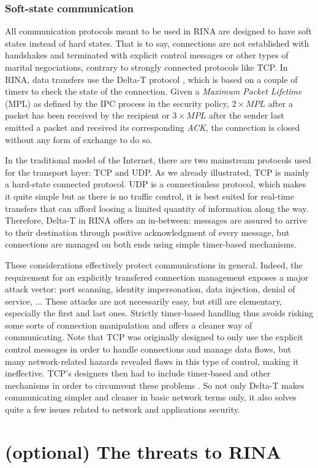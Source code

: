 \documentclass[a4paper]{proc}
\begin{document}
\section{Soft-state communication}

\par All communication protocols meant to be used in RINA are designed to have
soft states instead of hard states. That is to say, connections are not
established with handshakes and terminated with explicit control messages or
other types of marital negociations, contrary to strongly connected protocols
like TCP. In RINA, data transfers use the Delta-T protocol \cite{delta-t}, which
is based on a couple of timers to check the state of the connection. Given a
\textit{Maximum Packet Lifetime} (MPL) as defined by the IPC process in the
security policy, $2 \times MPL$ after a packet has been received by the
recipient or $3 \times MPL$ after the sender last emitted a packet and received
its corresponding \textit{ACK}, the connection is closed without any form of
exchange to do so.

\par In the traditional model of the Internet, there are two mainstream
protocols used for the transport layer: TCP and UDP. As we already illustrated,
TCP is mainly a hard-state connected protocol. UDP is a connectionless protocol,
which makes it quite simple but as there is no traffic control, it is best
suited for real-time transfers that can afford loosing a limited quantity of
information along the way. Therefore, Delta-T in RINA offers an in-between:
messages are assured to arrive to their destination through positive
acknowledgment of every message, but connections are managed on both ends using
simple timer-based mechanisms.

\par These considerations effectively protect communications in general. Indeed,
the requirement for an explicitly transfered connection management exposes a
major attack vector: port scanning, identity impersonation, data injection,
denial of service, ... These attacks are not necessarily easy, but still are
elementary, especially the first and last ones. Strictly timer-based handling
thus avoids risking some sorts of connection manipulation and offers a cleaner
way of communicating. Note that TCP was originally designed to only use the
explicit control messages in order to handle connections and manage data flows,
but many network-related hazards revealed flaws in this type of control, making
it ineffective. TCP's designers then had to include timer-based and other
mechanisms in order to circumvent these problems \cite{delta-t}. So not only
Delta-T makes communicating simpler and cleaner in basic network terms only, it
also solves quite a few issues related to network and applications security.

\part{(optional) The threats to RINA}

\nocite{*}
\newpage


\end{document}
